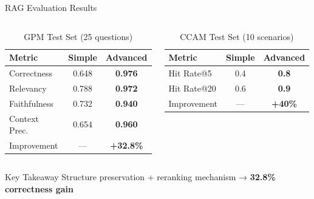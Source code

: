 \documentclass[aspectratio=169]{beamer}
\begin{document}
\begin{frame}{RAG Evaluation Results}
\begin{columns}[T]
\begin{table}
\centering
\caption{GPM Test Set (25 questions)}
\scriptsize
\begin{tabular}{lcc}
\toprule
\textbf{Metric} & \textbf{Simple} & \textbf{Advanced} \\
\midrule
Correctness & 0.648 & \textcolor{torusgreen}{\textbf{0.976}} \\
Relevancy & 0.788 & \textcolor{torusgreen}{\textbf{0.972}} \\
Faithfulness & 0.732 & \textcolor{torusgreen}{\textbf{0.940}} \\
Context Prec. & 0.654 & \textcolor{torusgreen}{\textbf{0.960}} \\
\midrule
Improvement & — & \textcolor{torusgreen}{\textbf{+32.8\%}} \\
\bottomrule
\end{tabular}
\end{table}

\begin{table}
\centering
\caption{CCAM Test Set (10 scenarios)}
\scriptsize
\begin{tabular}{lcc}
\toprule
\textbf{Metric} & \textbf{Simple} & \textbf{Advanced} \\
\midrule
Hit Rate@5 & 0.4 & \textcolor{torusgreen}{\textbf{0.8}} \\
Hit Rate@20 & 0.6 & \textcolor{torusgreen}{\textbf{0.9}} \\
\midrule
Improvement & — & \textcolor{torusgreen}{\textbf{+40\%}} \\
\bottomrule
\end{tabular}
\end{table}
\end{columns}

\vspace{0.5cm}
\begin{block}{Key Takeaway}
Structure preservation + reranking mechanism → \textbf{32.8\% correctness gain}
\end{block}
\end{frame}

\end{document}
